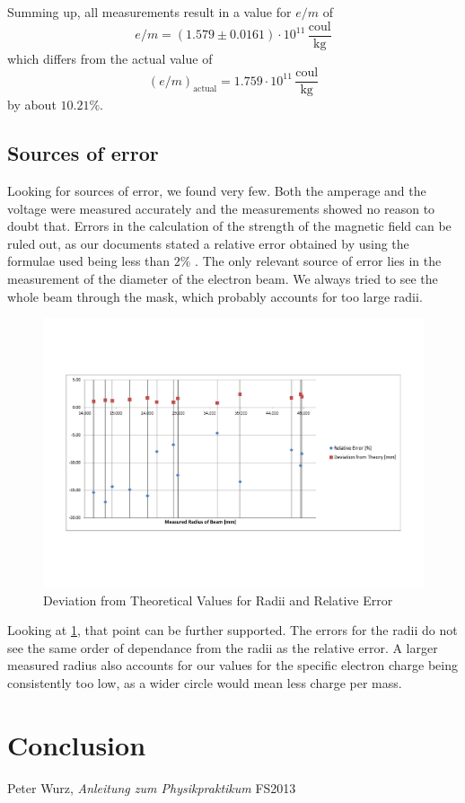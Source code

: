 \documentclass{scrreprt}
\newcommand{\unit}[1]{\ensuremath{\, \mathrm{#1}}}
\begin{document}
Summing up, all measurements result in a value for $e/m$ of
\begin{equation}
e/m = \left( 1.579 \pm 0.0161 \right)\cdot 10^{11} \unit{\frac{coul}{kg}}
\end{equation}
which differs from the actual value of 
\begin{equation}
(e/m)_{\text{actual}} = 1.759 \cdot 10^{11} \unit{\frac{coul}{kg}}
\end{equation}
by about $10.21\%$.

\subsection{Sources of error}
\label{sec:error}
Looking for sources of error, we found very few. Both the amperage and the voltage were measured accurately and the measurements showed no reason to doubt that. Errors in the calculation of the strength of the magnetic field can be ruled out, as our documents stated a relative error obtained by using the formulae used being less than $2\%$ \cite[p. 174]{physcript13}. 
The only relevant source of error lies in the measurement of the diameter of the electron beam. We always tried to see the whole beam through the mask, which probably accounts for too large radii. 
\begin{figure}[H]
	\centering
  \includegraphics[width=1.0\textwidth]{diag/errors.pdf}
	\caption{Deviation from Theoretical Values for Radii and Relative Error}
	\label{fig:error}
\end{figure}

Looking at \ref{fig:error}, that point can be further supported. The errors for the radii do not see the same order of dependance from the radii as the relative error. A larger measured radius also accounts for our values for the specific electron charge being consistently too low, as a wider circle would mean less charge per mass.

\section{Conclusion}

\begin{thebibliography}{9}

  Peter Wurz,
  \emph{Anleitung zum Physikpraktikum}
  FS2013

\end{thebibliography}
\end{document}
